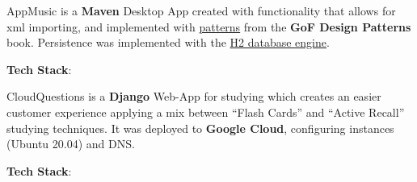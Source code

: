 \documentclass[10pt,a4paper,ragged2e]{altacv}
\begin{document}
\vspace{2mm}


\divider


AppMusic is a \textbf{Maven} Desktop App created with functionality that allows
for xml importing, and implemented with
\href{https://github.com/Qkessler/AppMusic#patterns}{patterns} from
the \textbf{GoF Design Patterns} book. Persistence was implemented with the
\href{https://www.h2database.com/html/main.html}{H2 database engine}.

\vspace{2mm}

\textbf{Tech Stack}:
\\

\vspace{2mm}


\divider

CloudQuestions is a \textbf{Django} Web-App for studying which creates an easier customer experience applying a mix between “Flash Cards” and “Active Recall” studying techniques. It was deployed to \textbf{Google Cloud}, configuring instances (Ubuntu 20.04) and DNS.

\vspace{2mm}

\textbf{Tech Stack}:
\\

\vspace{2mm}

\\

\medskip

\clearpage

\end{document}
